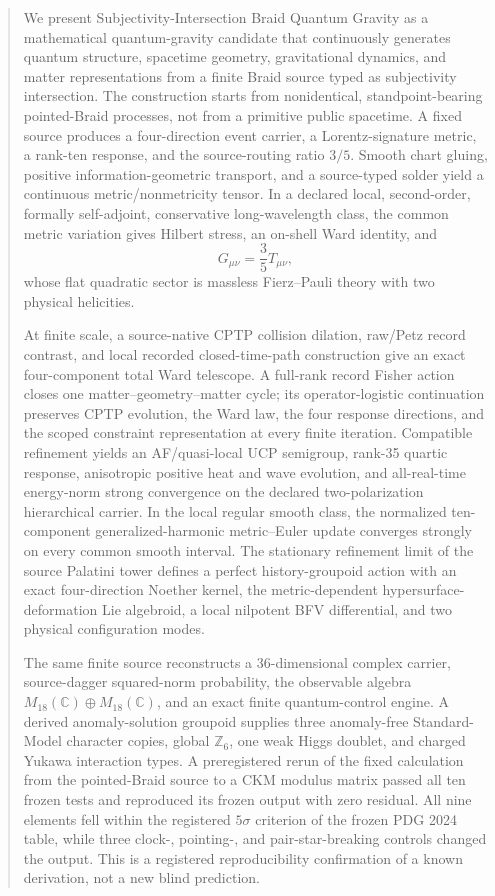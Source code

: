 \documentclass[11pt]{article}
\theoremstyle{definition}
\theoremstyle{remark}
\begin{document}
\begin{abstract}
We present Subjectivity-Intersection Braid Quantum Gravity as a mathematical quantum-gravity candidate that continuously generates quantum structure, spacetime geometry, gravitational dynamics, and matter representations from a finite Braid source typed as subjectivity intersection. The construction starts from nonidentical, standpoint-bearing pointed-Braid processes, not from a primitive public spacetime. A fixed source produces a four-direction event carrier, a Lorentz-signature metric, a rank-ten response, and the source-routing ratio $3/5$. Smooth chart gluing, positive information-geometric transport, and a source-typed solder yield a continuous metric/nonmetricity tensor. In a declared local, second-order, formally self-adjoint, conservative long-wavelength class, the common metric variation gives Hilbert stress, an on-shell Ward identity, and
\[
G_{\mu\nu}=\frac35T_{\mu\nu},
\]
whose flat quadratic sector is massless Fierz--Pauli theory with two physical helicities.

At finite scale, a source-native CPTP collision dilation, raw/Petz record contrast, and local recorded closed-time-path construction give an exact four-component total Ward telescope. A full-rank record Fisher action closes one matter--geometry--matter cycle; its operator-logistic continuation preserves CPTP evolution, the Ward law, the four response directions, and the scoped constraint representation at every finite iteration. Compatible refinement yields an AF/quasi-local UCP semigroup, rank-35 quartic response, anisotropic positive heat and wave evolution, and all-real-time energy-norm strong convergence on the declared two-polarization hierarchical carrier. In the local regular smooth class, the normalized ten-component generalized-harmonic metric--Euler update converges strongly on every common smooth interval. The stationary refinement limit of the source Palatini tower defines a perfect history-groupoid action with an exact four-direction Noether kernel, the metric-dependent hypersurface-deformation Lie algebroid, a local nilpotent BFV differential, and two physical configuration modes.

The same finite source reconstructs a 36-dimensional complex carrier, source-dagger squared-norm probability, the observable algebra $M_{18}(\mathbb C)\oplus M_{18}(\mathbb C)$, and an exact finite quantum-control engine. A derived anomaly-solution groupoid supplies three anomaly-free Standard-Model character copies, global $\mathbb Z_6$, one weak Higgs doublet, and charged Yukawa interaction types. A preregistered rerun of the fixed calculation from the pointed-Braid source to a CKM modulus matrix passed all ten frozen tests and reproduced its frozen output with zero residual. All nine elements fell within the registered $5\sigma$ criterion of the frozen PDG 2024 table, while three clock-, pointing-, and pair-star-breaking controls changed the output. This is a registered reproducibility confirmation of a known derivation, not a new blind prediction.


\end{abstract}
\end{document}
